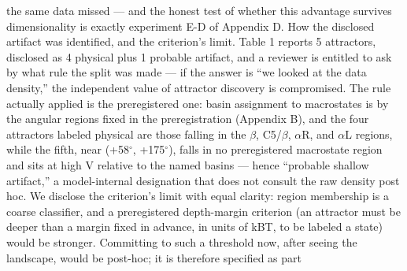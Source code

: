 \documentclass{article}
\begin{document}
the same data missed --- and the honest test of whether this advantage survives dimensionality is
exactly experiment E-D of Appendix D.
How the disclosed artifact was identified, and the criterion's limit.
Table 1 reports 5 attractors,
disclosed as 4 physical plus 1 probable artifact, and a reviewer is entitled to ask by what rule the
split was made --- if the answer is ``we looked at the data density,'' the independent value of attractor
discovery is compromised. The rule actually applied is the preregistered one: basin assignment
to macrostates is by the angular regions fixed in the preregistration (Appendix B), and the four
attractors labeled physical are those falling in the $\beta$, C5/$\beta$, $\alpha$R, and $\alpha$L regions, while the fifth, near
(+58$^\circ$, +175$^\circ$), falls in no preregistered macrostate region and sits at high V relative to the named
basins --- hence ``probable shallow artifact,'' a model-internal designation that does not consult the
raw density post hoc. We disclose the criterion's limit with equal clarity: region membership is
a coarse classifier, and a preregistered depth-margin criterion (an attractor must be deeper than a
margin fixed in advance, in units of kBT, to be labeled a state) would be stronger. Committing to
such a threshold now, after seeing the landscape, would be post-hoc; it is therefore specified as part
\clearpage

\end{document}
